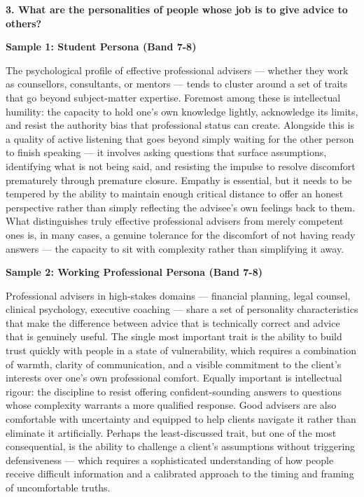 \begin{ieltsquestion}
\textbf{3. What are the personalities of people whose job is to give advice to others?}
\end{ieltsquestion}
\textbf{Sample 1: Student Persona (Band 7-8)}

The psychological profile of effective professional advisers — whether they work as counsellors, consultants, or mentors — tends to cluster around a set of traits that go beyond subject-matter expertise. Foremost among these is intellectual humility: the capacity to hold one's own knowledge lightly, acknowledge its limits, and resist the authority bias that professional status can create. Alongside this is a quality of active listening that goes beyond simply waiting for the other person to finish speaking — it involves asking questions that surface assumptions, identifying what is not being said, and resisting the impulse to resolve discomfort prematurely through premature closure. Empathy is essential, but it needs to be tempered by the ability to maintain enough critical distance to offer an honest perspective rather than simply reflecting the advisee's own feelings back to them. What distinguishes truly effective professional advisers from merely competent ones is, in many cases, a genuine tolerance for the discomfort of not having ready answers — the capacity to sit with complexity rather than simplifying it away.

\textbf{Sample 2: Working Professional Persona (Band 7-8)}

Professional advisers in high-stakes domains — financial planning, legal counsel, clinical psychology, executive coaching — share a set of personality characteristics that make the difference between advice that is technically correct and advice that is genuinely useful. The single most important trait is the ability to build trust quickly with people in a state of vulnerability, which requires a combination of warmth, clarity of communication, and a visible commitment to the client's interests over one's own professional comfort. Equally important is intellectual rigour: the discipline to resist offering confident-sounding answers to questions whose complexity warrants a more qualified response. Good advisers are also comfortable with uncertainty and equipped to help clients navigate it rather than eliminate it artificially. Perhaps the least-discussed trait, but one of the most consequential, is the ability to challenge a client's assumptions without triggering defensiveness — which requires a sophisticated understanding of how people receive difficult information and a calibrated approach to the timing and framing of uncomfortable truths.

